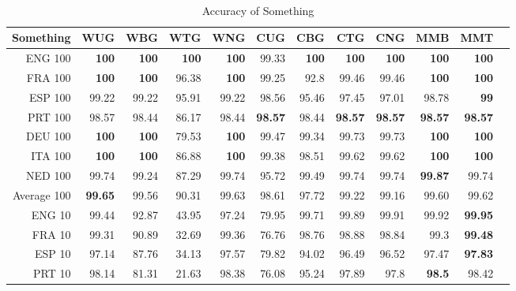 \begin{sidewaystable}
\caption{Accuracy of Something}
\label {AccuracyOfSomething}
\\
\begin{tabular}{|r|r|r|r|r|r|r|r|r|r|r|r|}
\hline
Something & \hspace{2 mm} WUG  & \hspace{2 mm} WBG & \hspace{2 mm} WTG & \hspace{2 mm} WNG & \hspace{2 mm} CUG & \hspace{2 mm} CBG & \hspace{2 mm} CTG & \hspace{2 mm} CNG  & \hspace{2 mm} MMB & \hspace{2 mm} MMT\\
\hline
ENG 100 & {\bf 100} & {\bf 100} & {\bf 100} & {\bf 100} & 99.33 & {\bf 100} & {\bf 100} & {\bf 100}  & {\bf 100} & {\bf 100}\\
\hline
FRA 100 & {\bf 100} & {\bf 100} & 96.38 & {\bf 100} & 99.25 & 92.8 & 99.46 & 99.46 &  {\bf 100} & {\bf 100}\\
\hline
ESP 100 & 99.22 &	99.22	& 95.91 &	99.22	& 98.56 & 95.46	& 97.45 &	97.01 &	98.78 & {\bf 99}\\
\hline
PRT 100 & 98.57 &	98.44 &	86.17 &	98.44 &	{\bf 98.57} &	98.44 &	{\bf 98.57} &	{\bf 98.57} &	{\bf 98.57} &	{\bf 98.57}\\
\hline
DEU 100 & {\bf 100} & {\bf 100} &	79.53 & 	 {\bf 100} &	99.47 &	99.34 &	99.73 &	99.73 & {\bf 100} &	{\bf 100}\\
\hline
ITA 100 & {\bf 100} &	{\bf 100} &	86.88 &	{\bf 100}&	99.38 &	98.51 &	99.62 &	99.62 &	{\bf 100} &	{\bf 100}\\
\hline
NED 100 & 99.74 &	99.24 &	87.29 &	99.74 &	95.72 &	99.49 &	99.74 &	99.74 &	{\bf 99.87} &	99.74\\
\hline
Average 100   & {\bf 99.65} & 99.56 & 90.31 & 99.63 & 98.61 & 97.72 & 99.22 & 99.16 & 99.60 & 99.62\\
\hline
ENG 10 & 99.44 & 92.87 & 43.95 & 97.24 & 79.95 & 99.71 & 99.89 & 99.91  & 99.92 & {\bf 99.95}\\
\hline
FRA 10 & 99.31 & 90.89 & 32.69 & 99.36 & 76.76 & 98.76 & 98.88 & 98.84 &  99.3 & {\bf 99.48}\\
\hline
ESP 10 & 97.14 &	87.76 &	34.13 &	97.57 &	79.82 &	94.02 &	96.49 &	96.52 &	97.47 &	{\bf 97.83}\\
\hline
PRT 10 & 98.14 &	81.31 &	21.63 &	98.38 &	76.08 &	95.24 &	97.89 &	97.8 &	{\bf 98.5} &	98.42\\

\end{tabular}
\end{sidewaystable}

